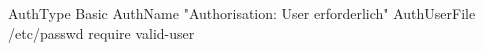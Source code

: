 \begin{ospcode}
AuthType Basic
AuthName "Authorisation: User erforderlich"
AuthUserFile /etc/passwd
require valid-user
\end{ospcode}
